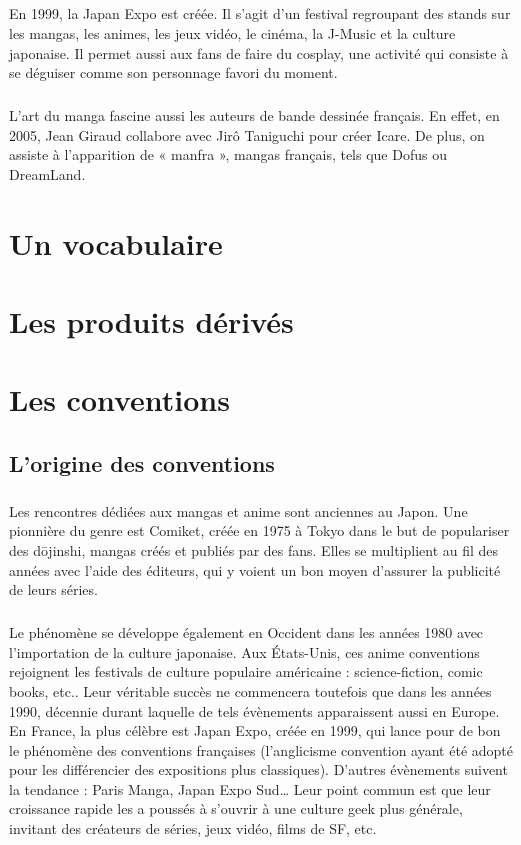 \paragraph{}
En 1999, la Japan Expo est créée. Il s’agit d’un festival regroupant des stands sur les mangas, les animes, les jeux vidéo, le cinéma, la J-Music et la culture japonaise. Il permet aussi aux fans de faire du cosplay, une activité qui consiste à se déguiser comme son personnage favori du moment. 
\paragraph{}
L’art du manga fascine aussi les auteurs de bande dessinée français. En effet, en 2005, Jean Giraud collabore avec Jirô Taniguchi pour créer Icare. De plus, on assiste à l’apparition de « manfra », mangas français, tels que Dofus ou DreamLand.

\chapter{Un vocabulaire}

\chapter{Les produits dérivés}

\chapter{Les conventions}
\section{L'origine des conventions}
\paragraph{}
Les rencontres dédiées aux mangas et anime sont anciennes au Japon. Une pionnière du genre est Comiket, créée en 1975 à Tokyo dans le but de populariser des d\=ojinshi, mangas créés et publiés par des fans. Elles se multiplient au fil des années avec l’aide des éditeurs, qui y voient un bon moyen d’assurer la publicité de leurs séries.
\paragraph{}
Le phénomène se développe également en Occident dans les années 1980 avec l’importation de la culture japonaise. Aux États-Unis, ces anime conventions rejoignent les festivals de culture populaire américaine : science-fiction, comic books, etc.. Leur véritable succès ne commencera toutefois que dans les années 1990, décennie durant laquelle de tels évènements apparaissent aussi en Europe. En France, la plus célèbre est Japan Expo, créée en 1999, qui lance pour de bon le phénomène des conventions françaises (l’anglicisme convention ayant été adopté pour les différencier des expositions plus classiques). D’autres évènements suivent la tendance : Paris Manga, Japan Expo Sud… Leur point commun est que leur croissance rapide les a poussés à s’ouvrir à une culture geek plus générale, invitant des créateurs de séries, jeux vidéo, films de SF, etc.

